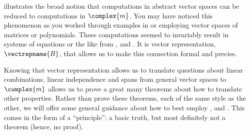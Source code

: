 %
 illustrates the broad notion that computations in abstract vector spaces can be reduced to computations in $\complex{m}$.  You may have noticed this phenomenon as you worked through examples in  or  employing vector spaces of matrices or polynomials.  These computations seemed to invariably result in systems of equations or the like from ,  and .  It is vector representation, $\vectrepname{B}$, that allows us to make this connection formal and precise.\par
%
Knowing that vector representation allows us to translate questions about linear combinations, linear independence and spans from general vector spaces to $\complex{m}$ allows us to prove a great many theorems about how to translate other properties.  Rather than prove these theorems, each of the same style as the other, we will offer some general guidance about how to best employ ,  and .  This comes in the form of a ``principle'': a basic truth, but most definitely not a theorem (hence, no proof).\par\medskip
%
